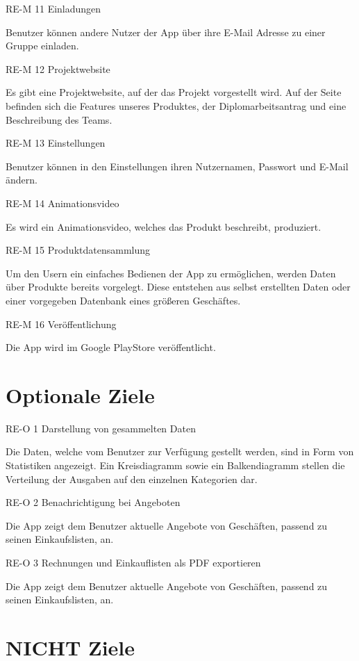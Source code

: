 RE-M 11 Einladungen

Benutzer können andere Nutzer der App über ihre E-Mail Adresse zu einer
Gruppe einladen.

RE-M 12 Projektwebsite

Es gibt eine Projektwebsite, auf der das Projekt vorgestellt wird. Auf
der Seite befinden sich die Features unseres Produktes, der
Diplomarbeitsantrag und eine Beschreibung des Teams.

RE-M 13 Einstellungen

Benutzer können in den Einstellungen ihren Nutzernamen, Passwort und
E-Mail ändern.

RE-M 14 Animationsvideo

Es wird ein Animationsvideo, welches das Produkt beschreibt, produziert.

RE-M 15 Produktdatensammlung

Um den Usern ein einfaches Bedienen der App zu ermöglichen, werden Daten
über Produkte bereits vorgelegt. Diese entstehen aus selbst erstellten
Daten oder einer vorgegeben Datenbank eines größeren Geschäftes.

RE-M 16 Veröffentlichung

Die App wird im Google PlayStore veröffentlicht.

\hypertarget{optionale-ziele}{%
\section{Optionale Ziele}\label{optionale-ziele}}

RE-O 1 Darstellung von gesammelten Daten

Die Daten, welche vom Benutzer zur Verfügung gestellt werden, sind in
Form von Statistiken angezeigt. Ein Kreisdiagramm sowie ein
Balkendiagramm stellen die Verteilung der Ausgaben auf den einzelnen
Kategorien dar.

RE-O 2 Benachrichtigung bei Angeboten

Die App zeigt dem Benutzer aktuelle Angebote von Geschäften, passend zu
seinen Einkaufslisten, an.

RE-O 3 Rechnungen und Einkauflisten als PDF exportieren

Die App zeigt dem Benutzer aktuelle Angebote von Geschäften, passend zu
seinen Einkaufslisten, an.

\hypertarget{nicht-ziele}{%
\section{NICHT Ziele}\label{nicht-ziele}}

